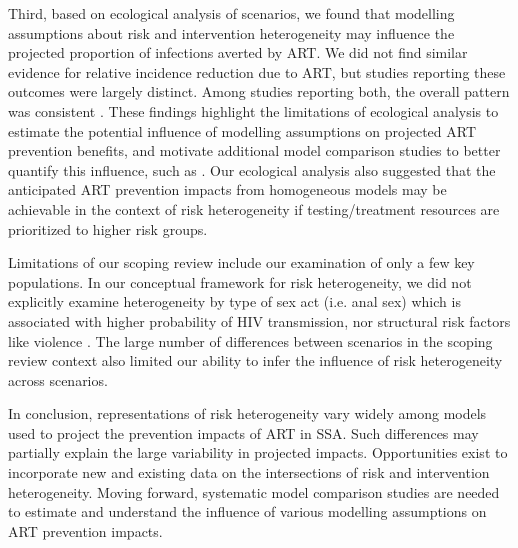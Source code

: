 Third, based on ecological analysis of scenarios, we found that
modelling assumptions about risk and intervention heterogeneity
may influence the projected proportion of infections averted by ART.
We did not find similar evidence for relative incidence reduction due to ART,
but studies reporting these outcomes were largely distinct.
Among studies reporting both, the overall pattern was consistent
\cite{Salomon2005,Abbas2006,Pretorius2010,Nichols2014,Barnighausen2016,Maheu-Giroux2017,Akudibillah2018}.
These findings highlight the limitations of ecological analysis to estimate
the potential influence of modelling assumptions on projected ART prevention benefits,
and motivate additional model comparison studies to better quantify this influence,
such as \cite{Dodd2010,Hontelez2013}.
Our ecological analysis also suggested that the anticipated ART prevention impacts from homogeneous models
may be achievable in the context of risk heterogeneity
if testing/treatment resources are prioritized to higher risk groups.

Limitations of our scoping review include our examination of only a few key populations.
In our conceptual framework for risk heterogeneity, we did not explicitly examine heterogeneity
by type of sex act (i.e. anal sex) which is associated with higher probability of HIV transmission,
nor structural risk factors like violence \cite{Silverman2011,Baggaley2013}.
The large number of differences between scenarios in the scoping review context
also limited our ability to infer the influence of risk heterogeneity across scenarios.

In conclusion, representations of risk heterogeneity vary widely
among models used to project the prevention impacts of ART in SSA.
Such differences may partially explain the large variability in projected impacts.
Opportunities exist to incorporate new and existing data on
the intersections of risk and intervention heterogeneity.
Moving forward, systematic model comparison studies are needed to
estimate and understand the influence of various modelling assumptions on ART prevention impacts.
